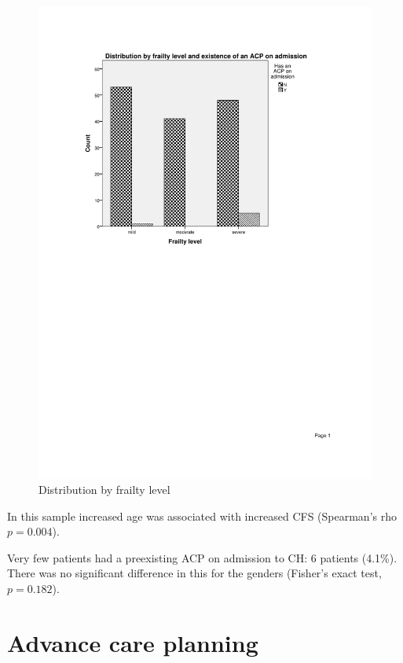 \documentclass
[
	12pt,
	a4paper,
	oneside,
]{report}
\begin{document}
\begin{figure}[ht]
\caption{Distribution by frailty level}
\label{fig:chart-dist-frailty-level}
\includegraphics[width=\textwidth,
	trim={2.5cm 14cm 2.5cm 2.5cm},
	clip]{media/chart-dist-frailty-level}
\end{figure}

In this sample increased age was associated with increased CFS (Spearman's rho
$p=0.004$).

Very few patients had a preexisting ACP on admission to CH: 6
patients (4.1\%). There was no significant difference in this
for the genders (Fisher's exact test, $p=0.182$).


\section{Advance care planning}
\end{document}
